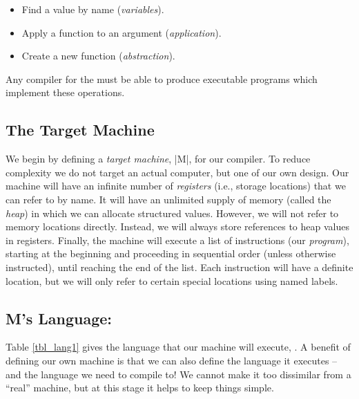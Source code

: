 \documentclass[12pt]{report}
\begin{document}
\begin{itemize}
\item Find a value by name (\emph{variables}).
\item Apply a function to an argument (\emph{application}).
\item Create a new function (\emph{abstraction}). 
\end{itemize}

Any compiler for the \lamA must be able to produce executable programs
which implement these operations. 

\subsection{The Target Machine}
We begin by defining a \emph{target machine}, |M|, for our compiler. To
reduce complexity we do not target an actual computer, but one of our
own design. Our machine will have an infinite number of
\emph{registers} (i.e., storage locations) that we can refer to by
name. It will have an unlimited supply of memory (called the
\emph{heap}) in which we can allocate structured values. However, we
will not refer to memory locations directly. Instead, we will always
store references to heap values in registers. Finally, the machine
will execute a list of instructions (our \emph{program}), starting at
the beginning and proceeding in sequential order (unless otherwise
instructed), until reaching the end of the list. Each instruction will
have a definite location, but we will only refer to certain special
locations using named labels.

\subsection{M's Language: \machLam}
Table \ref{tbl_lang1} gives the language that our machine will
execute, \machLam. A benefit of defining our own machine is that we
can also define the language it executes -- and the language we need
to compile to! We cannot make it too dissimilar from a ``real''
machine, but at this stage it helps to keep things simple. 
\end{document}
